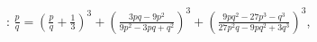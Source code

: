 \documentclass[preview]{standalone}
\begin{document}
\begin{center}
: $ \frac{p}{q} = \left( \frac{p}{q} + \frac{1}{3} \right)^3 + \left( \frac{3pq - 9p^2}{9p^2 - 3pq + q^2} \right)^3 + \left( \frac{9pq^2 - 27p^3 - q^3}{27p^2q - 9pq^2 + 3q^3} \right)^3 $,
\end{center}
\end{document}
